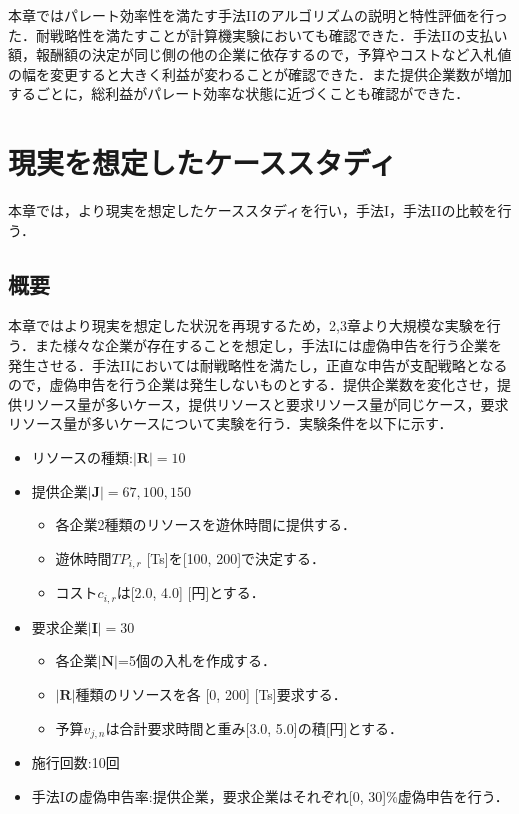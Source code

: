 本章ではパレート効率性を満たす手法IIのアルゴリズムの説明と特性評価を行った．耐戦略性を満たすことが計算機実験においても確認できた．手法IIの支払い額，報酬額の決定が同じ側の他の企業に依存するので，予算やコストなど入札値の幅を変更すると大きく利益が変わることが確認できた．また提供企業数が増加するごとに，総利益がパレート効率な状態に近づくことも確認ができた．

\hypertarget{ux73feux5b9fux3092ux60f3ux5b9aux3057ux305fux30b1ux30fcux30b9ux30b9ux30bfux30c7ux30a3}{%
\chapter{現実を想定したケーススタディ}\label{ux73feux5b9fux3092ux60f3ux5b9aux3057ux305fux30b1ux30fcux30b9ux30b9ux30bfux30c7ux30a3}}

本章では，より現実を想定したケーススタディを行い，手法I，手法IIの比較を行う．

\hypertarget{ux6982ux8981-2}{%
\section{概要}\label{ux6982ux8981-2}}

本章ではより現実を想定した状況を再現するため，2,3章より大規模な実験を行う．また様々な企業が存在することを想定し，手法Iには虚偽申告を行う企業を発生させる．手法IIにおいては耐戦略性を満たし，正直な申告が支配戦略となるので，虚偽申告を行う企業は発生しないものとする．提供企業数を変化させ，提供リソース量が多いケース，提供リソースと要求リソース量が同じケース，要求リソース量が多いケースについて実験を行う．実験条件を以下に示す．

\begin{itemize}
\tightlist
\item
  リソースの種類:\(|\boldsymbol{R}|=10\)
\item
  提供企業\(|\boldsymbol{J}|=67,100,150\)

  \begin{itemize}
  \tightlist
  \item
    各企業2種類のリソースを遊休時間に提供する．
  \item
    遊休時間\(TP_{i,r}\) {[}Ts{]}を{[}100, 200{]}で決定する．
  \item
    コスト\(c_{i,r}\)は{[}2.0, 4.0{]} {[}円{]}とする．
  \end{itemize}
\item
  要求企業\(|\boldsymbol{I}|=30\)

  \begin{itemize}
  \tightlist
  \item
    各企業\(|\boldsymbol{N}|\)=5個の入札を作成する．
  \item
    \(|\boldsymbol{R}|\)種類のリソースを各 {[}0, 200{]}
    {[}Ts{]}要求する．
  \item
    予算\(v_{j,n}\)は合計要求時間と重み{[}3.0,
    5.0{]}の積{[}円{]}とする．
  \end{itemize}
\item
  施行回数:10回
\item
  手法Iの虚偽申告率:提供企業，要求企業はそれぞれ{[}0,
  30{]}\%虚偽申告を行う．
\end{itemize}

